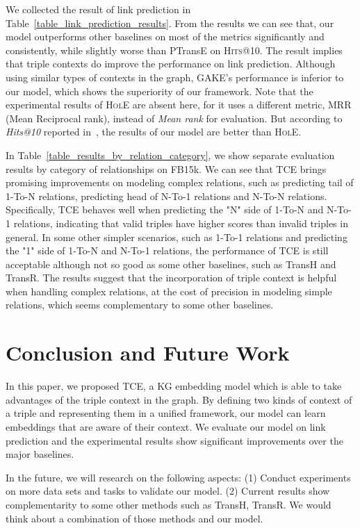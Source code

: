 We collected the result of link prediction in Table~\ref{table_link_prediction_results}. From the results we can see that, our model outperforms other baselines on most of the metrics significantly and consistently, while slightly worse than PTransE on \textsc{Hits}@10. The result implies that triple contexts do improve the performance on link prediction. Although using similar types of contexts in the graph, GAKE's performance is inferior to our model, which shows the superiority of our framework. Note that the experimental results of \textsc{HolE} are absent here, for it uses a different metric, MRR (Mean Reciprocal rank), instead of \textit{Mean rank} for evaluation. But according to \textit{Hits@10} reported in~\cite{NickelRP16}, the results of our model are better than \textsc{HolE}.



In Table~\ref{table_results_by_relation_category}, we show separate evaluation results by category of relationships on FB15k. We can see that TCE brings promising improvements on modeling complex relations, such as predicting tail of 1-To-N relations, predicting head of N-To-1 relations and N-To-N relations. Specifically, TCE behaves well when predicting the "N" side of 1-To-N and N-To-1 relations, indicating that valid triples have higher scores than invalid triples in general. In some other simpler scenarios, such as 1-To-1 relations and predicting the "1" side of 1-To-N and N-To-1 relations, the performance of TCE is still acceptable although not so good as some other baselines, such as TransH and TransR. The results suggest that the incorporation of triple context is helpful when handling complex relations, at the cost of precision in modeling simple relations, which seems complementary to some other baselines.



\section{Conclusion and Future Work}
In this paper, we proposed TCE, a KG embedding model which is able to take advantages of the triple context in the graph. By defining two kinds of context of a triple and representing them in a unified framework, our model can learn embeddings that are aware of their context. We evaluate our model on link prediction and the experimental results show significant improvements over the major baselines.

In the future, we will research on the following aspects: (1) Conduct experiments on more data sets and tasks to validate our model. (2) Current results show complementarity to some other methods such as TransH, TransR. We would think about a combination of those methods and our model.
